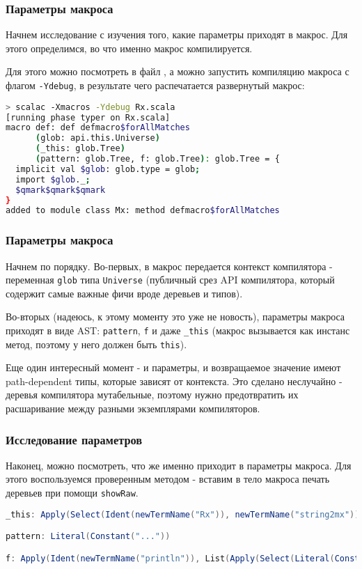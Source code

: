 \documentclass[hyperref={bookmarks=false}]{beamer}
\begin{document}
\begin{frame}[t,fragile]
\frametitle{Параметры макроса}

Начнем исследование с изучения того, какие параметры приходят в макрос. Для этого определимся, во что именно макрос компилируется.

Для этого можно посмотреть в файл , а можно запустить компиляцию макроса с флагом \texttt{-Ydebug}, в результате чего распечатается развернутый макрос:

\begin{lstlisting}[language=sh]
> scalac -Xmacros -Ydebug Rx.scala
[running phase typer on Rx.scala]
macro def: def defmacro$forAllMatches
      (glob: api.this.Universe)
      (_this: glob.Tree)
      (pattern: glob.Tree, f: glob.Tree): glob.Tree = {
  implicit val $glob: glob.type = glob;
  import $glob._;
  $qmark$qmark$qmark
}
added to module class Mx: method defmacro$forAllMatches
\end{lstlisting}
\end{frame}

\begin{frame}[t,fragile]
\frametitle{Параметры макроса}

Начнем по порядку. Во-первых, в макрос передается контекст компилятора - переменная \texttt{glob} типа \texttt{Universe} (публичный срез API компилятора, который содержит самые важные фичи вроде деревьев и типов).

Во-вторых (надеюсь, к этому моменту это уже не новость), параметры макроса приходят в виде AST: \texttt{pattern}, \texttt{f} и даже \texttt{\_this} (макрос вызывается как инстанс метод, поэтому у него должен быть \texttt{this}).

Еще один интересный момент - и параметры, и возвращаемое значение имеют path-dependent типы, которые зависят от контекста. Это сделано неслучайно - деревья компилятора мутабельные, поэтому нужно предотвратить их расшаривание между разными экземплярами компиляторов.
\end{frame}

\begin{frame}[t,fragile]
\frametitle{Исследование параметров}

Наконец, можно посмотреть, что же именно приходит в параметры макроса. Для этого воспользуемся проверенным методом - вставим в тело макроса печать деревьев при помощи \texttt{showRaw}.

\begin{lstlisting}[language=scala]
_this: Apply(Select(Ident(newTermName("Rx")), newTermName("string2mx")), List(Select(This(newTypeName("Test")), newTermName("s"))))

pattern: Literal(Constant("..."))

f: Apply(Ident(newTermName("println")), List(Apply(Select(Literal(Constant("...")), newTermName("format")), List(Ident(newTermName("key")), Ident(newTermName("value"))))))
\end{lstlisting}
\end{frame}
\end{document}
